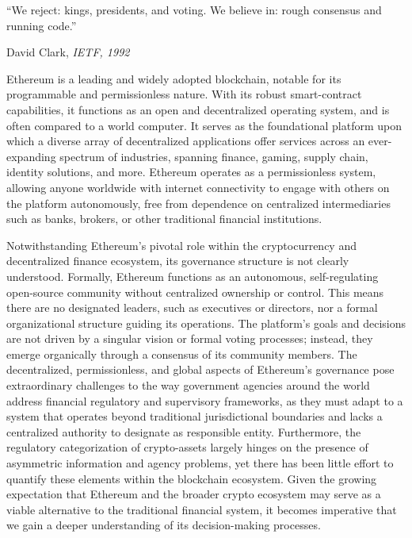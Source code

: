 \documentclass[No]{AEA}
\begin{document}
\clearpage







\epigraph{``We reject: kings, presidents, and voting. We believe in: rough consensus and running code.''}{David Clark, \textit{IETF, 1992}}

\setcounter{page}{1}
\doublespacing

Ethereum is a leading and widely adopted blockchain, notable for its programmable and permissionless nature. With its robust smart-contract capabilities, it functions as an open and decentralized operating system, and is often compared to a world computer. It serves as the foundational platform upon which a diverse array of decentralized applications offer services across an ever-expanding spectrum of industries, spanning finance, gaming, supply chain, identity solutions, and more. Ethereum operates as a permissionless system, allowing anyone worldwide with internet connectivity to engage with others on the platform autonomously, free from dependence on centralized intermediaries such as banks, brokers, or other traditional financial institutions.

Notwithstanding Ethereum's pivotal role within the cryptocurrency and decentralized finance ecosystem, its governance structure is not clearly understood. Formally, Ethereum functions as an autonomous, self-regulating open-source community without centralized ownership or control. This means there are no designated leaders, such as executives or directors, nor a formal organizational structure guiding its operations. The platform's goals and decisions are not driven by a singular vision or formal voting processes; instead, they emerge organically through a consensus of its community members. The decentralized, permissionless, and global aspects of Ethereum's governance pose extraordinary challenges to the way government agencies around the world address financial regulatory and supervisory frameworks, as they must adapt to a system that operates beyond traditional jurisdictional boundaries and lacks a centralized authority to designate as responsible entity. Furthermore, the regulatory categorization of crypto-assets largely hinges on the presence of asymmetric information and agency problems, yet there has been little effort to quantify these elements within the blockchain ecosystem. Given the growing expectation that Ethereum and the broader crypto ecosystem may serve as a viable alternative to the traditional financial system, it becomes imperative that we gain a deeper understanding of its decision-making processes. 
\end{document}
